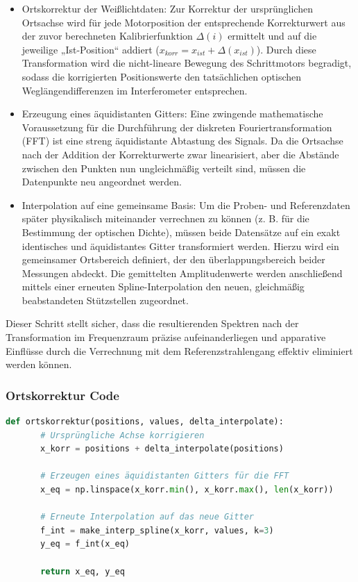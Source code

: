 \documentclass[10pt,a4paper]{article}
\begin{document}
\begin{itemize}
       \item Ortskorrektur der Weißlichtdaten: Zur Korrektur der ursprünglichen Ortsachse wird für jede Motorposition der entsprechende Korrekturwert aus der zuvor berechneten Kalibrierfunktion $\Delta(i)$ ermittelt und auf die jeweilige „Ist-Position“ addiert ($x_{korr}=x_{ist}+\Delta(x_{ist})$). Durch diese Transformation wird die nicht-lineare Bewegung des Schrittmotors begradigt, sodass die korrigierten Positionswerte den tatsächlichen optischen Weglängendifferenzen im Interferometer entsprechen.
       \item Erzeugung eines äquidistanten Gitters: Eine zwingende mathematische Voraussetzung für die Durchführung der diskreten Fouriertransformation (FFT) ist eine streng äquidistante Abtastung des Signals. Da die Ortsachse nach der Addition der Korrekturwerte zwar linearisiert, aber die Abstände zwischen den Punkten nun ungleichmäßig verteilt sind, müssen die Datenpunkte neu angeordnet werden.
       \item Interpolation auf eine gemeinsame Basis: Um die Proben- und Referenzdaten später physikalisch miteinander verrechnen zu können (z. B. für die Bestimmung der optischen Dichte), müssen beide Datensätze auf ein exakt identisches und äquidistantes Gitter transformiert werden. Hierzu wird ein gemeinsamer Ortsbereich definiert, der den überlappungsbereich beider Messungen abdeckt. Die gemittelten Amplitudenwerte werden anschließend mittels einer erneuten Spline-Interpolation den neuen, gleichmäßig beabstandeten Stützstellen zugeordnet.
\end{itemize}

Dieser Schritt stellt sicher, dass die resultierenden Spektren nach der Transformation im Frequenzraum präzise aufeinanderliegen und apparative Einflüsse durch die Verrechnung mit dem Referenzstrahlengang effektiv eliminiert werden können.

\subsubsection{Ortskorrektur Code}

\begin{lstlisting}[language=Python, caption=Ortskorrektur]
def ortskorrektur(positions, values, delta_interpolate):
       # Ursprüngliche Achse korrigieren
       x_korr = positions + delta_interpolate(positions)
       
       # Erzeugen eines äquidistanten Gitters für die FFT
       x_eq = np.linspace(x_korr.min(), x_korr.max(), len(x_korr))
       
       # Erneute Interpolation auf das neue Gitter
       f_int = make_interp_spline(x_korr, values, k=3)
       y_eq = f_int(x_eq)
       
       return x_eq, y_eq
\end{lstlisting}
\end{document}
